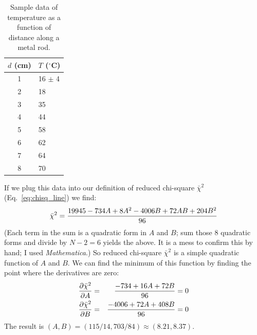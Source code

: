 \begin{table}[h]
\begin{center}
\begin{tabular}{|cl|}
\hline
$d$ (cm) &\hspace{5pt} $T$ ($^{\circ}$C)  \\ \hline
1& \hspace{5pt} 16 $\pm$ 4  \\
2& \hspace{5pt} 18  \\
3& \hspace{5pt} 35  \\
4& \hspace{5pt} 44  \\
5& \hspace{5pt} 58  \\
6& \hspace{5pt} 62  \\
7& \hspace{5pt} 64  \\
8& \hspace{5pt} 70  \\  \hline
\end{tabular}
\end{center}
\caption{Sample data of temperature as a function of distance along a metal
         rod.  \label{table:tempD}}
\end{table}

If we plug this data into our definition of reduced chi-square $\bar{\chi}^{2}$ (Eq.~\ref{eq:chisq_line})
we find:
\begin{equation}
\bar{\chi}^{2}= { 19945 - 734 A + 8 A^2  - 4006 B + 72 AB + 204 B^2 \over 96}
\end{equation}
(Each term in the sum is a quadratic form in $A$ and $B$; sum those 8 quadratic forms
and divide by $N-2=6$ yields the above.  It is a mess to confirm this by hand; I used
{\em Mathematica}.) So reduced chi-square $\bar{\chi}^{2}$ is a simple quadratic
function of $A$ and $B$. We can find the minimum of this function by finding the
point where the derivatives are zero:
\begin{eqnarray}
{\partial\bar{\chi}^{2}\over \partial A}&=& { -734 +16 A +72 B  \over 96} =0 \\
{\partial\bar{\chi}^{2}\over \partial B}&=& { -4006 + 72 A + 408 B  \over 96} =0 \\
\end{eqnarray}
The result is $(A,B)=(115/14,703/84)\approx(8.21, 8.37)$.

